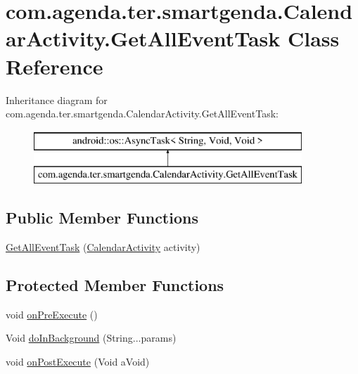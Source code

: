 \hypertarget{classcom_1_1agenda_1_1ter_1_1smartgenda_1_1_calendar_activity_1_1_get_all_event_task}{\section{com.\-agenda.\-ter.\-smartgenda.\-Calendar\-Activity.\-Get\-All\-Event\-Task Class Reference}
\label{classcom_1_1agenda_1_1ter_1_1smartgenda_1_1_calendar_activity_1_1_get_all_event_task}
}
Inheritance diagram for com.\-agenda.\-ter.\-smartgenda.\-Calendar\-Activity.\-Get\-All\-Event\-Task\-:\begin{figure}[H]
\begin{center}
\leavevmode
\includegraphics[height=2.000000cm]{classcom_1_1agenda_1_1ter_1_1smartgenda_1_1_calendar_activity_1_1_get_all_event_task}
\end{center}
\end{figure}
\subsection*{Public Member Functions}
\begin{DoxyCompactItemize}
\item 
\hyperlink{classcom_1_1agenda_1_1ter_1_1smartgenda_1_1_calendar_activity_1_1_get_all_event_task_a767befe1945f491a33bfe1fadd831098}{Get\-All\-Event\-Task} (\hyperlink{classcom_1_1agenda_1_1ter_1_1smartgenda_1_1_calendar_activity}{Calendar\-Activity} activity)
\end{DoxyCompactItemize}
\subsection*{Protected Member Functions}
\begin{DoxyCompactItemize}
\item 
void \hyperlink{classcom_1_1agenda_1_1ter_1_1smartgenda_1_1_calendar_activity_1_1_get_all_event_task_aeafe4ac2db98cd4257cc0b305dad0eeb}{on\-Pre\-Execute} ()
\item 
Void \hyperlink{classcom_1_1agenda_1_1ter_1_1smartgenda_1_1_calendar_activity_1_1_get_all_event_task_a26010bf78db163285afb49d5b28675a4}{do\-In\-Background} (String...\-params)
\item 
void \hyperlink{classcom_1_1agenda_1_1ter_1_1smartgenda_1_1_calendar_activity_1_1_get_all_event_task_a13bac28dd2c01ed0b3b064d4f49cacbb}{on\-Post\-Execute} (Void a\-Void)
\end{DoxyCompactItemize}


